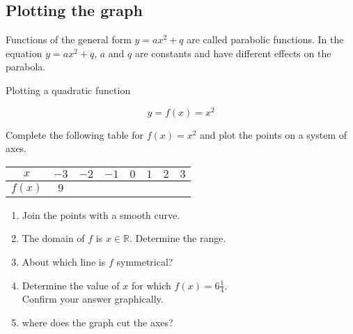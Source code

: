 \subsection*{Plotting the graph}         
Functions of the general form $y=a{x}^{2}+q$ are called parabolic functions. In the equation $y=a{x}^{2}+q$, $a$ and $q$ are constants and have different effects on the parabola. 
\par
{}
\clearpage
\begin{wex}{Plotting a quadratic function}
{
\begin{minipage}{\textwidth}
\begin{equation*}
 y = f(x) = x^{2}
\end{equation*}

Complete the following table for $f(x)=x^{2}$ and plot the points on a system of axes.
\\
\begin{center}
\begin{tabular}{|c|c|c|c|c|c|c|c|}
\hline
  $x$ &  $-3$ & $-2$ & $-1$ & $0$ & $1$ & $2$ & $3$
\\ \hline
 $f(x)$& $9$ & \hspace{1cm} & \hspace{1cm} & \hspace{1cm} & \hspace{1cm} & \hspace{1cm} & \hspace{1cm} 
\\ \hline
\end{tabular}
\end{center}
\vspace{10pt}
\begin{enumerate}[noitemsep, label=\textbf{\arabic*}. ] 
 \item Join the points with a smooth curve.
\item The domain of $f$ is $x \in \mathbb{R}$. Determine the range.
\item About which line is $f$ symmetrical?
\item Determine the value of $x$ for which $f(x) = 6\frac{1}{4}$. \\Confirm your answer graphically.
\item  where does the graph cut the axes?
\end{enumerate}
\end{minipage}
}
{
\begin{equation*}
 \begin{array}{cclcc}

\end{array}
\end{equation*}}
\end{wex}
